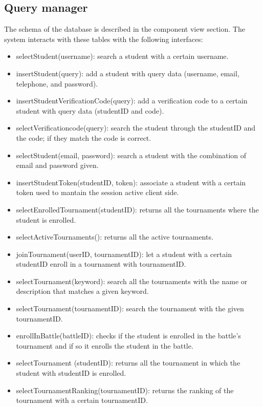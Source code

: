 \documentclass[12pt, a4paper]{report}
\begin{document}
    \subsection{Query manager}
    The schema of the database is described in the component view section. 
    The system interacts with these tables with the following interfaces: 
    \begin{itemize}
        \item selectStudent(username): search a student with a certain username. 
        \item insertStudent(query): add a student with query data (username, email, telephone, and password).
        \item insertStudentVerificationCode(query): add a verification code to a certain student with query data (studentID and code). 
        \item selectVerificationcode(query): search the student through the studentID and the code; if they match the code is correct. 
        \item selectStudent(email, password): search a student with the combination of email and password given. 
        \item insertStudentToken(studentID, token): associate a student with a certain token used to mantain the session active client side. 
        \item selectEnrolledTournament(studentID): returns all the tournaments where the student is enrolled. 
        \item selectActiveTournaments(): returns all the active tournaments. 
        \item joinTournament(userID, tournamentID): let a student with a certain studentID enroll in a tournament with tournamentID. 
        \item selectTournament(keyword): search all the tournaments with the name or description that matches a given keyword. 
        \item selectTournament(tournamentID): search the tournament with the given tournamentID. 
        \item enrollInBattle(battleID): checks if the student is enrolled in the battle's tournament and if so it enrolls the student in the battle. 
        \item selectTournament (studentID): returns all the tournament in which the student with studentID is enrolled. 
        \item selectTournamentRanking(tournamentID): returns the ranking of the tournament with a certain tournamentID. 

\end{itemize}
\end{document}
